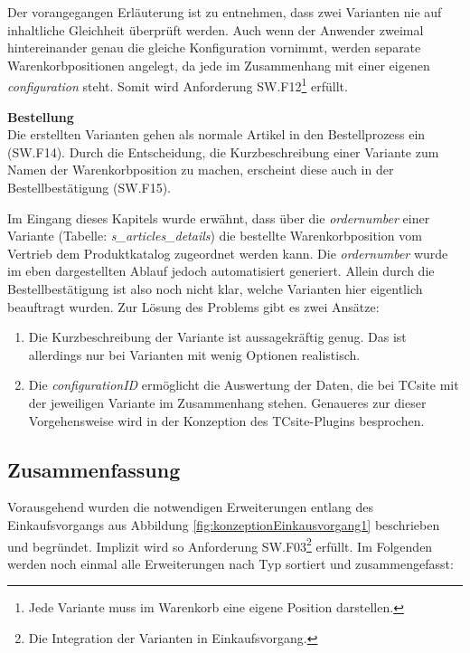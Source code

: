 \documentclass[11pt, a4paper, titlepage, listof=totoc, bibliography=totoc, index=totoc, twoside, openright, headings=normal]{scrreprt}
\begin{document}
Der vorangegangen Erläuterung ist zu entnehmen, dass zwei Varianten nie auf inhaltliche Gleichheit überprüft werden. Auch wenn der Anwender zweimal hintereinander genau die gleiche Konfiguration vornimmt, werden separate Warenkorbpositionen angelegt, da jede im Zusammenhang mit einer eigenen \emph{configuration} steht. Somit wird Anforderung SW.F12\footnote{Jede Variante muss im Warenkorb eine eigene Position darstellen.} erfüllt.

\textbf{Bestellung}\\
Die erstellten Varianten gehen als normale Artikel in den Bestellprozess ein (SW.F14). Durch die Entscheidung, die Kurzbeschreibung einer Variante zum Namen der Warenkorbposition zu machen, erscheint diese auch in der Bestellbestätigung (SW.F15).

Im Eingang dieses Kapitels wurde erwähnt, dass über die \emph{ordernumber} einer Variante (Tabelle: \emph{s\_articles\_details}) die bestellte Warenkorbposition vom Vertrieb dem Produktkatalog zugeordnet werden kann. Die \emph{ordernumber} wurde im eben dargestellten Ablauf jedoch automatisiert generiert. Allein durch die Bestellbestätigung ist also noch nicht klar, welche Varianten hier eigentlich beauftragt wurden. Zur Lösung des Problems gibt es zwei Ansätze:
\begin{enumerate}
\item Die Kurzbeschreibung der Variante ist aussagekräftig genug. Das ist allerdings nur bei Varianten mit wenig Optionen realistisch.
\item Die \emph{configurationID} ermöglicht die Auswertung der Daten, die bei TCsite mit der jeweiligen Variante im Zusammenhang stehen. Genaueres zur dieser Vorgehensweise wird in der Konzeption des TCsite-Plugins besprochen.
\end{enumerate}

\subsection{Zusammenfassung}
Vorausgehend wurden die notwendigen Erweiterungen entlang des Einkaufsvorgangs aus Abbildung \ref{fig:konzeptionEinkausvorgang1} beschrieben und begründet. Implizit wird so Anforderung SW.F03\footnote{Die Integration der Varianten in Einkaufsvorgang.} erfüllt. Im Folgenden werden noch einmal alle Erweiterungen nach Typ sortiert und zusammengefasst:
 
\end{document}
